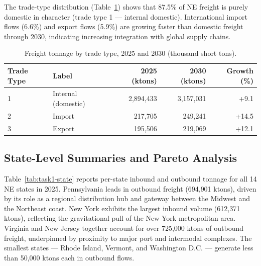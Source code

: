 The trade-type distribution (Table~\ref{tab:task1-trade}) shows that 87.5\% of
NE freight is purely domestic in character (trade type 1 — internal domestic).
International import flows (6.6\%) and export flows (5.9\%) are growing faster
than domestic freight through 2030, indicating increasing integration with global
supply chains.

\begin{table}[H]
\centering
\caption{Freight tonnage by trade type, 2025 and 2030 (thousand short tons).}
\begin{tabular}{llrrr}
\toprule
Trade Type & Label & 2025 (ktons) & 2030 (ktons) & Growth (\%) \\
\midrule
1 & Internal (domestic) & 2{,}894{,}433 & 3{,}157{,}031 & +9.1  \\
2 & Import              &   217{,}705 &   249{,}241 & +14.5 \\
3 & Export              &   195{,}506 &   219{,}069 & +12.1 \\
\bottomrule
\end{tabular}
\label{tab:task1-trade}
\end{table}

\subsection{State-Level Summaries and Pareto Analysis}

Table~\ref{tab:task1-state} reports per-state inbound and outbound tonnage for all 14
NE states in 2025. Pennsylvania leads in outbound freight (694{,}901 ktons), driven by
its role as a regional distribution hub and gateway between the Midwest and the
Northeast coast. New York exhibits the largest inbound volume (612{,}371 ktons),
reflecting the gravitational pull of the New York metropolitan area. Virginia and
New Jersey together account for over 725{,}000 ktons of outbound freight, underpinned
by proximity to major port and intermodal complexes. The smallest states — Rhode Island,
Vermont, and Washington D.C. — generate less than 50{,}000 ktons each in outbound flows.


